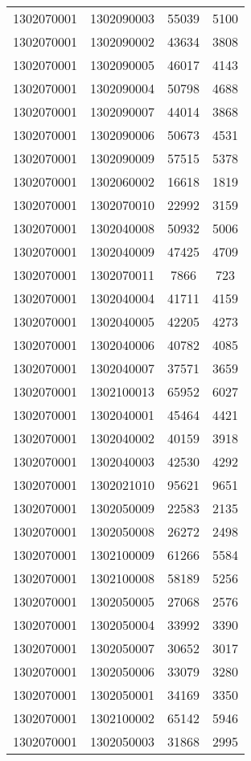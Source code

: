 \begin{longtable}[h]{llcc}
		1302070001 & 1302090003 & 55039 & 5100\\
		1302070001 & 1302090002 & 43634 & 3808\\
		1302070001 & 1302090005 & 46017 & 4143\\
		1302070001 & 1302090004 & 50798 & 4688\\
		1302070001 & 1302090007 & 44014 & 3868\\
		1302070001 & 1302090006 & 50673 & 4531\\
		1302070001 & 1302090009 & 57515 & 5378\\
		1302070001 & 1302060002 & 16618 & 1819\\
		1302070001 & 1302070010 & 22992 & 3159\\
		1302070001 & 1302040008 & 50932 & 5006\\
		1302070001 & 1302040009 & 47425 & 4709\\
		1302070001 & 1302070011 & 7866 & 723\\
		1302070001 & 1302040004 & 41711 & 4159\\
		1302070001 & 1302040005 & 42205 & 4273\\
		1302070001 & 1302040006 & 40782 & 4085\\
		1302070001 & 1302040007 & 37571 & 3659\\
		1302070001 & 1302100013 & 65952 & 6027\\
		1302070001 & 1302040001 & 45464 & 4421\\
		1302070001 & 1302040002 & 40159 & 3918\\
		1302070001 & 1302040003 & 42530 & 4292\\
		1302070001 & 1302021010 & 95621 & 9651\\
		1302070001 & 1302050009 & 22583 & 2135\\
		1302070001 & 1302050008 & 26272 & 2498\\
		1302070001 & 1302100009 & 61266 & 5584\\
		1302070001 & 1302100008 & 58189 & 5256\\
		1302070001 & 1302050005 & 27068 & 2576\\
		1302070001 & 1302050004 & 33992 & 3390\\
		1302070001 & 1302050007 & 30652 & 3017\\
		1302070001 & 1302050006 & 33079 & 3280\\
		1302070001 & 1302050001 & 34169 & 3350\\
		1302070001 & 1302100002 & 65142 & 5946\\
		1302070001 & 1302050003 & 31868 & 2995\\

\end{longtable}
